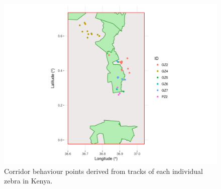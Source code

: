 \documentclass[12pt,a4paper, twoside, english]{article}
\begin{document}





\begin{figure}[H]
\includegraphics[width=\textwidth]{figures/Corridor_Points_KEN.png}
\caption[Corridor behaviour points derived from Laikipia zebra movements]{Corridor behaviour points derived from tracks of each individual zebra in Kenya.}
\label{fig:corridor_ken}
\end{figure}
\end{document}
